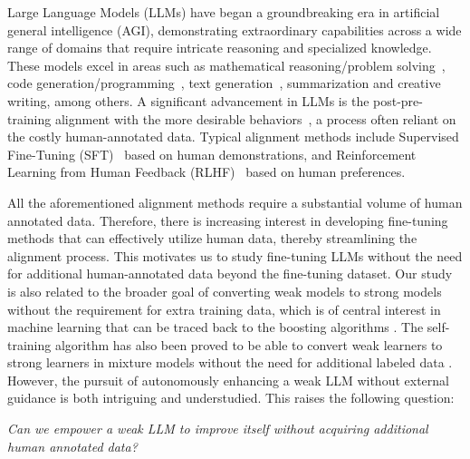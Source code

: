 \documentclass{article}
\begin{document}
Large Language Models (LLMs) have began a  groundbreaking era in artificial general intelligence (AGI), demonstrating extraordinary capabilities across a wide range of domains that require intricate reasoning and specialized knowledge. 
These models excel in areas such as mathematical reasoning/problem solving~\citep{cobbe2021training, wei2022chain,lewkowycz2022solving}, code generation/programming~\citep{chen2021evaluating, austin2021program, li2022competition}, text generation~\citep{bubeck2023sparks, anil2023palm, touvron2023llama}, summarization and creative writing, among others. 
A significant advancement in LLMs is the post-pre-training alignment with the more desirable behaviors~\citep{mishra2021cross, victor2022multitask, chung2022scaling, thoppilan2022lamda}, a process often reliant on the costly human-annotated data.
Typical alignment methods include Supervised Fine-Tuning (SFT)~\citep {ouyang2022training, tunstall2023zephyr} based on human demonstrations, and Reinforcement Learning from Human Feedback (RLHF)~\citep{christiano2017deep,ziegler2019fine, stiennon2020learning, bai2022training}  based on human preferences. 


All the aforementioned alignment methods require a substantial volume of human annotated data. Therefore, there is increasing interest in developing fine-tuning methods that can effectively utilize human data, thereby streamlining the alignment process. This motivates us to study fine-tuning LLMs without the need for additional human-annotated data beyond the fine-tuning dataset. Our study is also related to the broader goal of converting weak models to strong models without the requirement for extra training data, which is of central interest in machine learning that can be traced back to the boosting algorithms \citep{kearns1994cryptographic,schapire1990strength,freund1995boosting,freund1997decision}. The self-training algorithm \citep{vapnik1999nature,grandvalet2004semi,lee2013pseudolabel} has also been proved to be able to convert weak learners to strong learners in mixture models without the need for additional labeled data \citep{frei2022self,kou2022does}. 
However, the pursuit of autonomously enhancing a weak LLM without external guidance is both intriguing and understudied. 
This raises the following question: 
\begin{center}
\textit{Can we empower a weak LLM to improve itself without acquiring additional human annotated data?}
\end{center}
\end{document}
